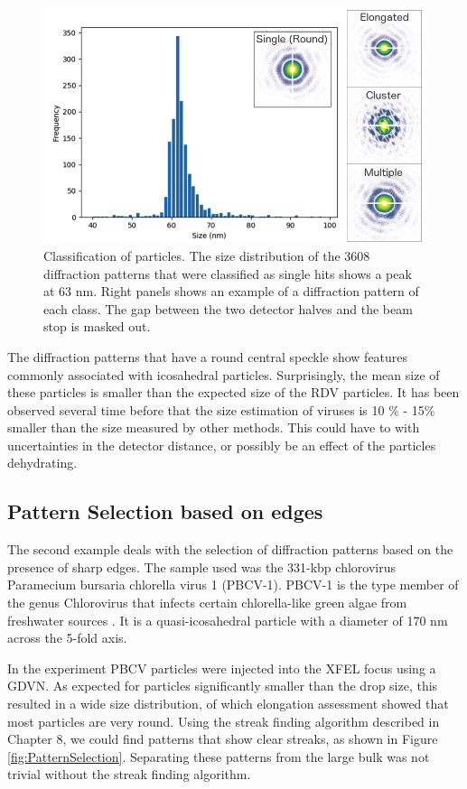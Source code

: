 \begin{figure}[!ht]
\centering
\includegraphics[width=120mm]{Chapter_09_Results_RDV.png}
\caption{Classification of particles. The size distribution of the 3608 diffraction patterns that were classified as single hits shows a peak at 63 nm. Right panels shows an  example of a diffraction pattern of each class. The gap between the two detector halves and the beam stop is masked out.}\label{fig:Classes}

\end{figure}

The diffraction patterns that have a round central speckle show features commonly associated with icosahedral particles. Surprisingly, the mean size of these particles is smaller than the expected size of the RDV particles. It has been observed several time before that the size estimation of viruses is 10 \% - 15\% smaller than the size measured by other methods. This could have to with uncertainties in the detector distance, or possibly be an effect of the particles dehydrating. 


\subsection{Pattern Selection based on edges}
The second example deals with the selection of diffraction patterns based on the presence of sharp edges. The sample used was the 331-kbp chlorovirus Paramecium bursaria chlorella virus 1 (PBCV-1). PBCV-1 is the type member of the genus Chlorovirus that infects certain chlorella-like green algae from freshwater sources \cite{VanEtten2012}. It is a quasi-icosahedral particle with a diameter of 170 nm across the 5-fold axis.

In the experiment PBCV particles were injected into the XFEL focus using a GDVN. As expected for particles significantly smaller than the drop size, this resulted in a wide size distribution, of which elongation assessment showed that most particles are very round. Using the streak finding algorithm described in Chapter 8, we could find patterns that show clear streaks, as shown in Figure \ref{fig:PatternSelection}. Separating these patterns from the large bulk was not trivial without the streak finding algorithm.

